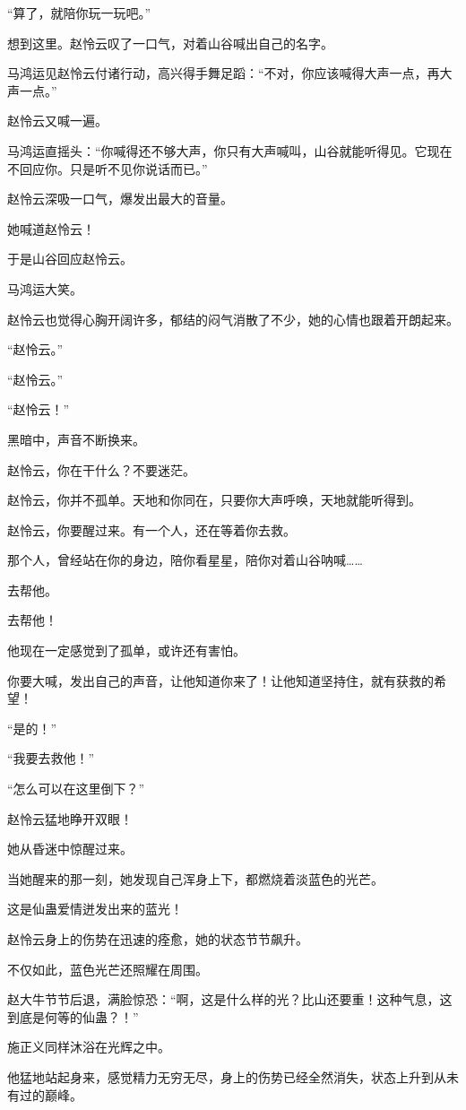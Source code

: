 \begin{this_body}
“算了，就陪你玩一玩吧。”

想到这里。赵怜云叹了一口气，对着山谷喊出自己的名字。

马鸿运见赵怜云付诸行动，高兴得手舞足蹈：“不对，你应该喊得大声一点，再大声一点。”

赵怜云又喊一遍。

马鸿运直摇头：“你喊得还不够大声，你只有大声喊叫，山谷就能听得见。它现在不回应你。只是听不见你说话而已。”

赵怜云深吸一口气，爆发出最大的音量。

她喊道赵怜云！

于是山谷回应赵怜云。

马鸿运大笑。

赵怜云也觉得心胸开阔许多，郁结的闷气消散了不少，她的心情也跟着开朗起来。

“赵怜云。”

“赵怜云。”

“赵怜云！”

黑暗中，声音不断换来。

赵怜云，你在干什么？不要迷茫。

赵怜云，你并不孤单。天地和你同在，只要你大声呼唤，天地就能听得到。

赵怜云，你要醒过来。有一个人，还在等着你去救。

那个人，曾经站在你的身边，陪你看星星，陪你对着山谷呐喊……

去帮他。

去帮他！

他现在一定感觉到了孤单，或许还有害怕。

你要大喊，发出自己的声音，让他知道你来了！让他知道坚持住，就有获救的希望！

“是的！”

“我要去救他！”

“怎么可以在这里倒下？”

赵怜云猛地睁开双眼！

她从昏迷中惊醒过来。

当她醒来的那一刻，她发现自己浑身上下，都燃烧着淡蓝色的光芒。

这是仙蛊爱情迸发出来的蓝光！

赵怜云身上的伤势在迅速的痊愈，她的状态节节飙升。

不仅如此，蓝色光芒还照耀在周围。

赵大牛节节后退，满脸惊恐：“啊，这是什么样的光？比山还要重！这种气息，这到底是何等的仙蛊？！”

施正义同样沐浴在光辉之中。

他猛地站起身来，感觉精力无穷无尽，身上的伤势已经全然消失，状态上升到从未有过的巅峰。


\end{this_body}
